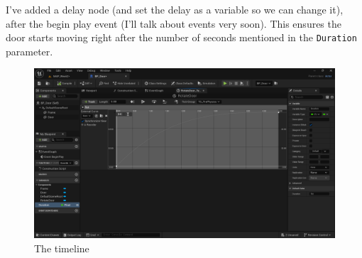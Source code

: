 \documentclass[]{article}
\begin{document}
	I've added a delay node (and set the delay as a variable so we can change it), after the begin play event (I'll talk about events very soon). This ensures the door starts moving right after the number of seconds mentioned in the \verb*|Duration| parameter.
	
	\newpage
	
	\begin{figure}[h]
		\centering
		\includegraphics[width=1\linewidth]{day4images/screenshot002}
		\caption{The timeline}
		\label{fig:screenshot002}
	\end{figure}
	
\end{document}
